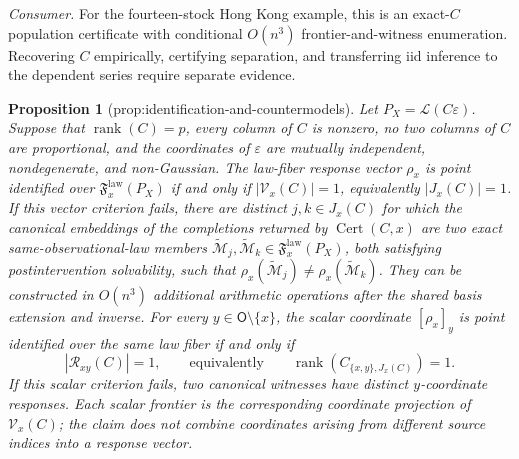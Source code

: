 \documentclass{article}
\newtheorem{proposition}{Proposition}
\begin{document}
\textit{Consumer.} For the fourteen-stock Hong Kong example, this is an exact-\(C\) population certificate with conditional \(O(n^3)\) frontier-and-witness enumeration. Recovering \(C\) empirically, certifying separation, and transferring iid inference to the dependent series require separate evidence.

\begin{proposition}[prop:identification-and-countermodels]\label{prop:identification-and-countermodels}
Let \(P_X=\mathcal L(C\varepsilon)\). Suppose that \(\operatorname{rank}(C)=p\), every column of \(C\) is nonzero, no two columns of \(C\) are proportional, and the coordinates of \(\varepsilon\) are mutually independent, nondegenerate, and non-Gaussian. The law-fiber response vector \(\rho_x\) is point identified over \(\mathfrak F_x^{\mathrm{law}}(P_X)\) if and only if \(|\mathcal V_x(C)|=1\), equivalently \(|J_x(C)|=1\). If this vector criterion fails, there are distinct \(j,k\in J_x(C)\) for which the canonical embeddings of the completions returned by \(\operatorname{Cert}(C,x)\) are two exact same-observational-law members \(\widetilde{\mathcal M}_j,\widetilde{\mathcal M}_k\in\mathfrak F_x^{\mathrm{law}}(P_X)\), both satisfying postintervention solvability, such that \(\rho_x(\widetilde{\mathcal M}_j)\ne\rho_x(\widetilde{\mathcal M}_k)\). They can be constructed in \(O(n^3)\) additional arithmetic operations after the shared basis extension and inverse. For every \(y\in\mathsf O\setminus\{x\}\), the scalar coordinate \([\rho_x]_y\) is point identified over the same law fiber if and only if
\[
 |\mathcal R_{xy}(C)|=1,
 \qquad\text{equivalently}\qquad
 \operatorname{rank}\!\left(C_{\{x,y\},J_x(C)}\right)=1.
\]
If this scalar criterion fails, two canonical witnesses have distinct \(y\)-coordinate responses. Each scalar frontier is the corresponding coordinate projection of \(\mathcal V_x(C)\); the claim does not combine coordinates arising from different source indices into a response vector.
\end{proposition}
\end{document}
